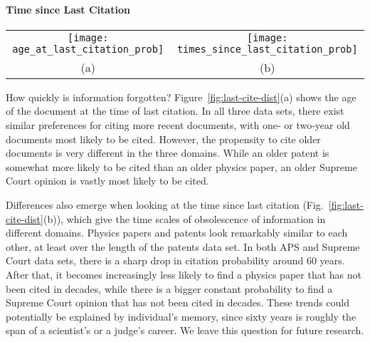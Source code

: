\documentclass[10pt]{bmc_article}
\newenvironment{bmcformat}{\baselineskip20pt\sloppy\setboolean{publ}{false}}{\baselineskip20pt\sloppy}
\begin{document}
\begin{bmcformat}
\paragraph{Time since Last Citation}

\begin{figure*}[htb] %
   \centering
   \begin{tabular}{@{}c@{}c@{}}
      \texttt{[image: age\_at\_last\_citation\_prob]} &
   \texttt{[image: times\_since\_last\_citation\_prob]}
  \\
   (a)  & (b)
   \end{tabular}
   \caption{Temporal characteristics of the last citation, including the (a) age and (b) time since last citation of a physics paper, a patent and US Supreme Court opinions (SC cases). The time to last citation is calculated from the end of the data set.}
   \label{fig:last-cite-dist}
\end{figure*}

How quickly is information forgotten? Figure~\ref{fig:last-cite-dist}(a) shows the age of the document at the time of last citation. In all three data sets, there exist similar preferences for citing more recent documents, with one- or two-year old documents most likely to be cited. However, the propensity to cite older documents is very different in the three domains. While an older patent is somewhat more likely to be cited than an older physics paper, an older Supreme Court opinion is vastly most likely to be cited.

Differences also emerge when looking at the time since last citation (Fig.~\ref{fig:last-cite-dist}(b)), which give the time scales of obsolescence of information in different domains. Physics papers and patents look remarkably similar to each other, at least over the length of the patents data set. In both APS and Supreme Court data sets, there is a sharp drop in citation probability around 60 years. After that, it becomes increasingly less likely to find a physics paper that has not been cited in decades, while there is a bigger constant probability to find a Supreme Court opinion that has not been cited in decades. These trends could potentially be explained by individual's memory, since sixty years is roughly the span of a scientist's or a judge's career. We leave this question for future research.


\end{bmcformat}
\end{document}
